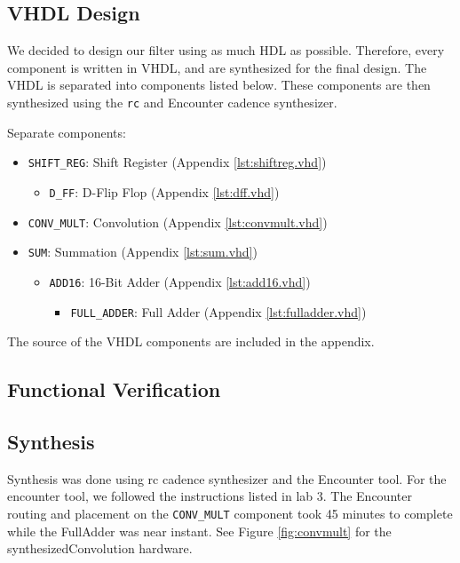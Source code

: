 \subsection{VHDL Design}
We decided to design our filter using as much HDL as possible.  Therefore, every component is written in VHDL, and are synthesized for the final design. The VHDL is separated into components listed below.  These components are then synthesized using the \texttt{rc} and Encounter cadence synthesizer.  

Separate components:
\begin{itemize}
\item \verb=SHIFT_REG=: Shift Register (Appendix \ref{lst:shiftreg.vhd})
	\begin{itemize}
		\item \verb=D_FF=: D-Flip Flop (Appendix \ref{lst:dff.vhd})
	\end{itemize}
\item \verb=CONV_MULT=: Convolution (Appendix \ref{lst:convmult.vhd})
\item \verb=SUM=: Summation (Appendix \ref{lst:sum.vhd})
	\begin{itemize}
		\item \verb=ADD16=: 16-Bit Adder (Appendix \ref{lst:add16.vhd})
		\begin{itemize}
			\item \verb=FULL_ADDER=: Full Adder (Appendix \ref{lst:fulladder.vhd})
		\end{itemize}
	\end{itemize}
\end{itemize}

The source of the VHDL components are included in the appendix.  

\subsection{Functional Verification}



\subsection{Synthesis}

Synthesis was done using rc cadence synthesizer and the Encounter tool.  For the encounter tool, we followed the instructions listed in lab 3.  The Encounter routing and placement on the \verb=CONV_MULT= component took 45 minutes to complete while the FullAdder was near instant.  See Figure \ref{fig:convmult} for the synthesizedConvolution hardware.

